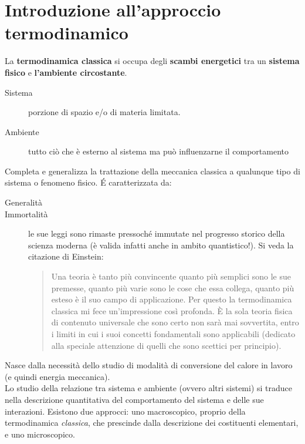 \documentclass[10pt, oneside]{book}
\begin{document}
\chapter{Introduzione all'approccio termodinamico}
La \textbf{termodinamica classica} si occupa degli \textbf{scambi energetici} tra un \textbf{sistema fisico} e \textbf{l'ambiente circostante}. 
\begin{description}
\item[Sistema] porzione di spazio e/o di materia limitata.
\item[Ambiente] tutto ciò che è esterno al sistema ma può influenzarne il comportamento
\end{description}
Completa e generalizza la trattazione della meccanica classica a qualunque tipo di sistema o fenomeno fisico. \'E caratterizzata da:
\begin{description}
\item[Generalità]
\item[Immortalità] le sue leggi sono rimaste pressoché immutate nel progresso storico della scienza moderna (è valida infatti anche in ambito quantistico!). Si veda la citazione di Einstein:
\begin{quote}
Una teoria è tanto più convincente quanto più semplici sono le sue premesse, quanto più varie sono le cose che essa collega, quanto più esteso è il suo campo di applicazione. Per questo la termodinamica classica mi fece un'impressione così profonda. È la sola teoria fisica di contenuto universale che sono certo non sarà mai sovvertita, entro i limiti in cui i suoi concetti fondamentali sono applicabili (dedicato alla speciale attenzione di quelli che 
sono scettici per principio).
\end{quote}
\end{description}
Nasce dalla necessità dello studio di modalità di conversione del calore in lavoro (e quindi energia meccanica).
\\Lo studio della relazione tra sistema e ambiente (ovvero altri sistemi) si traduce nella descrizione quantitativa del comportamento del sistema e delle sue interazioni. Esistono due approcci: uno macroscopico, proprio della termodinamica \textit{classica}, che prescinde dalla descrizione dei costituenti elementari, e uno microscopico.
\end{document}
